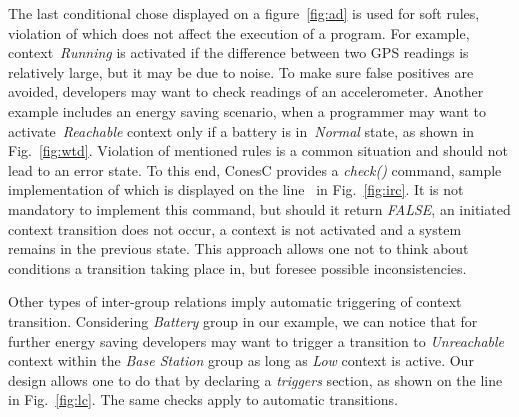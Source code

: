 The last conditional chose displayed on a figure~\ref{fig:ad} is used for soft rules, violation of
which does not affect the execution of a program. For example, context~\emph{Running} is
activated if the difference between two GPS readings is relatively large, but it may be due to noise.
To make sure false positives are avoided, developers may want to check
readings of an accelerometer. Another example includes an energy saving scenario,
when a programmer may want to activate~\emph{Reachable} context only if a battery is
in~\emph{Normal} state, as shown in Fig.~\ref{fig:wtd}.
Violation of mentioned rules is a common situation and should not lead to an error state.
To this end, ConesC provides a \emph{check()} command, sample implementation of which is
displayed on the line~ in Fig.~\ref{fig:irc}. It is not mandatory to implement this
command, but should it return \emph{FALSE}, an initiated context transition does not occur,
a context is not activated and a system remains in the previous state.
This approach allows one not to think about conditions a transition taking
place in, but foresee possible inconsistencies.


Other types of inter-group relations imply automatic triggering of context
transition. Considering \emph{Battery} group in our example, we can notice that
for further energy saving developers may want to trigger a transition to
\emph{Unreachable} context within the \emph{Base Station} group as long as
\emph{Low} context is active. Our design allows one to do that by declaring a
\emph{triggers} section, as shown on the line~ in Fig.~\ref{fig:lc}.
The same checks apply to automatic transitions.

